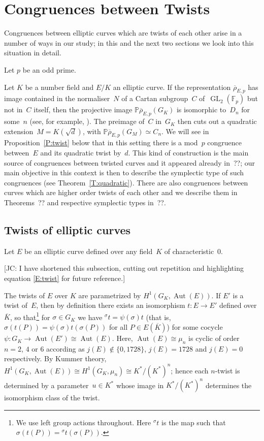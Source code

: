 \documentclass[12pt, reqno]{amsart}
\newcommand{\F}{\mathbb{F}}
\newcommand{\PP}{\mathbb{P}}
\newcommand{\Kbar}{{\overline{K}}}
\newcommand{\rhobar}{{\overline{\rho}}}
\DeclareMathOperator{\Aut}{Aut}
\newcommand{\GL}{\operatorname{GL}}
\numberwithin{equation}{section}
\theoremstyle{definition}
\theoremstyle{remark}
\newcommand{\jc}[1]{{\color{darkgreen} \textsf{[JC: #1]}}}
\begin{document}
\section{Congruences between Twists}\label{S:cong-twist}

Congruences between elliptic curves which are twists of each other
arise in a number of ways in our study; in this and the next two
sections we look into this situation in detail.

Let $p$ be an odd prime.

Let $K$ be a number field and $E/K$ an elliptic curve. If the
representation $\rhobar_{E,p}$ has image contained in the
normaliser~$N$ of a Cartan subgroup~$C$ of~$\GL_2(\F_p)$ but not
in~$C$ itself, then the projective image $\PP \rhobar_{E,p}(G_K)$ is
isomorphic to~$D_{n}$ for some~$n$ (see, for example, \cite[Theorem
  XI.2.3]{LangModForms}).  The preimage of~$C$ in~$G_K$ then cuts out
a quadratic extension~$M = K(\sqrt{d})$, with $\PP \rhobar_{E,p}(G_M)
\simeq C_n$.  We will see in Proposition~\ref{P:twist} below that in
this setting there is a mod~$p$ congruence between~$E$ and its
quadratic twist by~$d$.  This kind of construction is the main source
of congruences between twisted curves and it appeared already in~??;
our main objective in this context is then to describe the symplectic
type of such congruences (see Theorem~\ref{T:quadratic}). There are
also congruences between curves which are higher order twists of each
other and we describe them in Theorems~?? and respective symplectic
types in~??.

\subsection{Twists of elliptic curves}
\label{S:twists}

Let $E$ be an elliptic curve defined over any field~$K$ of
characteristic~$0$.

\jc{I have shortened this subsection, cutting out repetition and
  highlighting equation \eqref{E:twist} for future reference.}

The twists of $E$ over $K$ are parametrized by $H^1(G_K,\Aut(E))$.  If
$E'$ is a twist of~$E$, then by definition there exists an isomorphism
$t:E\to E'$ defined over $\Kbar$, so that\footnote{We use left group
  actions throughout.  Here ${}^{\sigma}t$ is the map such that
  $\sigma(t(P))={}^{\sigma}t(\sigma(P))$.}  for $\sigma\in G_K$ we
have ${}^{\sigma}t=\psi(\sigma)t$ (that is,
$\sigma(t(P))=\psi(\sigma)t(\sigma(P))$ for all $P\in E(\Kbar)$) for
some cocycle~$\psi:G_K\to\Aut(E')\cong\Aut(E)$.  Here,
$\Aut(E)\cong\mu_n$ is cyclic of order~$n=2$, $4$ or $6$ according as
$j(E)\not\in\{0,1728\}$, $j(E)=1728$ and $j(E)=0$ respectively.  By
Kummer theory, $H^1(G_K,\Aut(E))\cong H^1(G_K,\mu_n)\cong
K^*/(K^*)^n$; hence each $n$-twist is determined by a parameter~$u\in
K^*$ whose image in $K^*/(K^*)^n$ determines the isomorphism class of
the twist.
\end{document}
